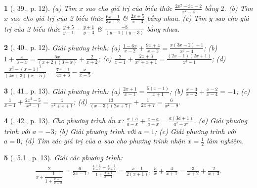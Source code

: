 \documentclass{article}
\newtheorem{baitoan}{}
\begin{document}
\begin{baitoan}[\cite{SBT_Toan_8_tap_2}, 39., p. 12]
	(a) Tìm $x$ sao cho giá trị của biểu thức $\frac{2x^2 - 3x - 2}{x^2 - 4}$ bằng $2$. (b) Tìm $x$ sao cho giá trị của 2 biểu thức $\frac{6x - 1}{3x + 2}$ \& $\frac{2x + 5}{x - 3}$ bằng nhau. (c) Tìm $y$ sao cho giá trị của 2 biểu thức $\frac{y + 5}{y - 1} - \frac{y + 1}{y - 3}$ \& $\frac{-8}{(y - 1)(y - 3)}$ bằng nhau.
\end{baitoan}

\begin{baitoan}[\cite{SBT_Toan_8_tap_2}, 40., p. 12]
	Giải phương trình: (a) $\frac{1 - 6x}{x - 2} + \frac{9x + 4}{x + 2} = \frac{x(3x - 2) + 1}{x^2 - 4}$; (b) $1 + \frac{x}{3 - x} = \frac{5x}{(x + 2)(3 - x)} + \frac{2}{x + 2}$; (c) $\frac{2}{x - 1} + \frac{2x + 3}{x^2 + x + 1} = \frac{(2x - 1)(2x + 1)}{x^3 - 1}$; (d) $\frac{x^3 - (x - 1)^3}{(4x + 3)(x - 5)} = \frac{7x - 1}{4x + 3} - \frac{x}{x - 5}$.
\end{baitoan}

\begin{baitoan}[\cite{SBT_Toan_8_tap_2}, 41., p. 13]
	Giải phương trình: (a) $\frac{2x + 1}{x - 1} = \frac{5(x - 1)}{x + 1}$; (b) $\frac{x - 3}{x - 2} + \frac{x - 2}{x - 4} = - 1$; (c) $\frac{1}{x - 1} + \frac{2x^2 - 5}{x^3 - 1} = \frac{4}{x^2 + x + 1}$; (d) $\frac{13}{(x - 3)(2x + 7)} + \frac{1}{2x + 7} = \frac{6}{x^2 - 9}$.
\end{baitoan}

\begin{baitoan}[\cite{SBT_Toan_8_tap_2}, 42., p. 13]
	Cho phương trình ẩn $x$: $\frac{x + a}{a - x} + \frac{x - a}{a + x} = \frac{a(3a + 1)}{a^2 - x^2}$. (a) Giải phương trình với $a = -3$; (b) Giải phương trình với $a = 1$; (c) Giải phương trình với $a = 0$; (d) Tìm các giá trị của $a$ sao cho phương trình nhận $x = \frac{1}{2}$ làm nghiệm.
\end{baitoan}

\begin{baitoan}[\cite{SBT_Toan_8_tap_2}, 5.1., p. 13]
	Giải các phương trình:
	\begin{align*}
		\frac{2}{x + \dfrac{1}{1 + \frac{x + 1}{x - 2}}} = \frac{6}{3x - 1},\ \frac{\frac{x + 1}{x - 1} - \frac{x - 1}{x + 1}}{1 + \frac{x + 1}{x - 1}} = \frac{x - 1}{2(x + 1)},\ \frac{5}{x} + \frac{4}{x + 1} = \frac{3}{x + 2} + \frac{2}{x + 3}.
	\end{align*}
\end{baitoan}

\end{document}
